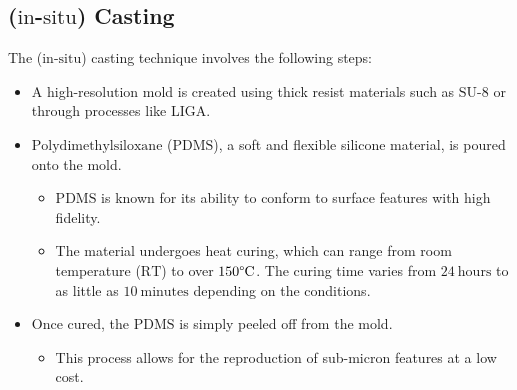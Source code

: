 \documentclass{report}
\begin{document}
\subsection{($\text{in}$-$\text{situ}$) Casting}
The ($\text{in}$-$\text{situ}$) casting technique involves the following steps:
\begin{itemize}
    \item A high-resolution mold is created using thick resist materials such as $\text{SU}$-$8$ or through processes like LIGA.
    \item $\text{Polydimethylsiloxane}$ ($\text{PDMS}$), a soft and flexible silicone material, is poured onto the mold.
    \begin{itemize}
        \item $\text{PDMS}$ is known for its ability to conform to surface features with high fidelity.
        \item The material undergoes heat curing, which can range from room temperature ($\text{RT}$) to over $150\text{\textdegree}\text{C}$. The curing time varies from $24~\text{hours}$ to as little as $10~\text{minutes}$ depending on the conditions.
    \end{itemize}
    \item Once cured, the $\text{PDMS}$ is simply peeled off from the mold.
    \begin{itemize}
        \item This process allows for the reproduction of sub-micron features at a low cost.
    \end{itemize}
\end{itemize}
\end{document}
